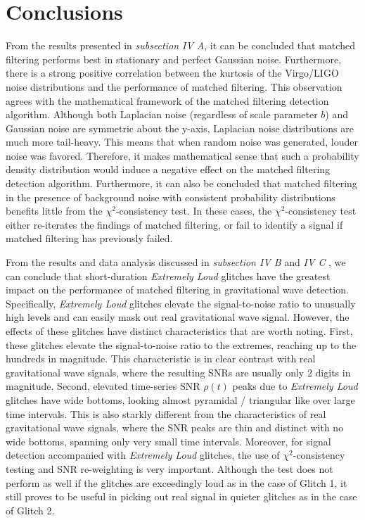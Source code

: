 \documentclass[preprint,
letterpaper,
 amsmath,amssymb,
 aps,
]{revtex4-2}
\begin{document}
\section{Conclusions} \label{conclusions}
From the results presented in \textit{subsection IV A}, it can be concluded that matched filtering performs best in stationary and perfect Gaussian noise. Furthermore, there is a strong positive correlation between the kurtosis of the Virgo/LIGO noise distributions and the performance of matched filtering. This observation agrees with the mathematical framework of the matched filtering detection algorithm. Although both Laplacian noise (regardless of scale parameter $b$) and Gaussian noise are symmetric about the y-axis, Laplacian noise distributions are much more tail-heavy. This means that when random noise was generated, louder noise was favored. Therefore, it makes mathematical sense that such a probability density distribution would induce a negative effect on the matched filtering detection algorithm. Furthermore, it can also be concluded that matched filtering in the presence of background noise with consistent probability distributions benefits little from the $\chi^2$-consistency test. In these cases, the $\chi^2$-consistency test either re-iterates the findings of matched filtering, or fail to identify a signal if matched filtering has previously failed.


From the results and data analysis discussed in \textit{subsection IV B} and \textit{IV C} , we can conclude that short-duration \textit{Extremely Loud} glitches have the greatest impact on the performance of matched filtering in gravitational wave detection. Specifically, \textit{Extremely Loud} glitches elevate the signal-to-noise ratio to unusually high levels and can easily mask out real gravitational wave signal. However, the effects of these glitches have distinct characteristics that are worth noting. First, these glitches elevate the signal-to-noise ratio to the extremes, reaching up to the hundreds in magnitude. This characteristic is in clear contrast with real gravitational wave signals, where the resulting SNRs are usually only 2 digits in magnitude. Second, elevated time-series SNR $\rho(t)$ peaks due to \textit{Extremely Loud} glitches have wide bottoms, looking almost pyramidal / triangular like over large time intervals. This is also starkly different from the characteristics of real gravitational wave signals, where the SNR peaks are thin and distinct with no wide bottoms, spanning only very small time intervals. Moreover, for signal detection accompanied with \textit{Extremely Loud} glitches, the use of $\chi^2$-consistency testing and SNR re-weighting is very important. Although the test does not perform as well if the glitches are exceedingly loud as in the case of Glitch 1, it still proves to be useful in picking out real signal in quieter glitches as in the case of Glitch 2.
\end{document}
